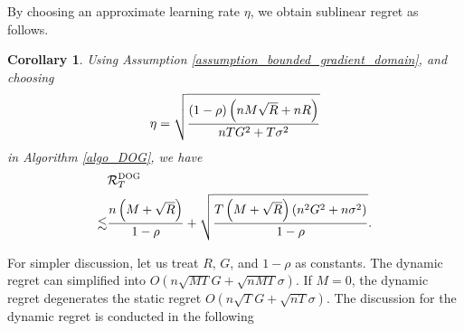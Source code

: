 \documentclass{article}
\newtheorem{Corollary}{\bf{Corollary}}
\begin{document}
By choosing an approximate learning rate $\eta$, we obtain sublinear regret as follows.
\begin{Corollary}
\label{corollary_regret_upper_bound}
Using Assumption \ref{assumption_bounded_gradient_domain}, and choosing 
\begin{align}
\nonumber
\eta = \sqrt{\frac{(1-\rho) \left( nM\sqrt{R} + nR \right)}{ nTG^2 + T\sigma^2 }}
\end{align} in Algorithm \ref{algo_DOG}, we have
\begin{align}
\label{equa_result_Corollary}
& {\mathcal{R}}_T^{\textsc{DOG}} \\ \nonumber
\lesssim &  \frac{n\left( M+\sqrt{R} \right)}{1-\rho} + \sqrt{\frac{T\left( M+\sqrt{R} \right)(n^2G^2 + n\sigma^2)}{1-\rho}}.
\end{align}
\end{Corollary}
For simpler discussion, let us treat $R$, $G$, and $1-\rho$ as constants. The dynamic regret can simplified into $O(n\sqrt{MT}G + \sqrt{nMT}\sigma)$. If $M=0$, the dynamic regret degenerates the static regret $O(n\sqrt{T}G + \sqrt{nT}\sigma)$.
The discussion for the dynamic regret is conducted in the following
\end{document}
